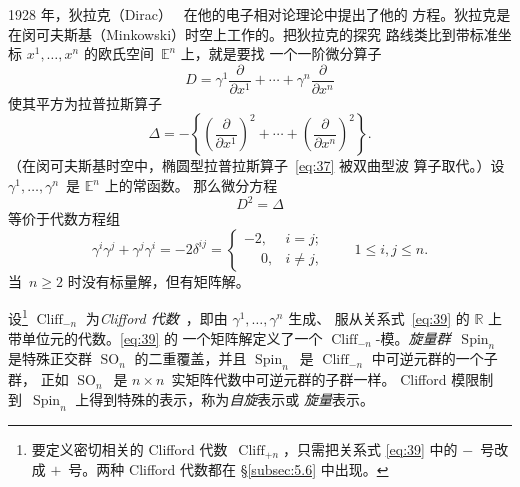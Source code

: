\documentclass[11pt]{amsart}
\theoremstyle{definition}
\theoremstyle{remark}
\theoremstyle{plain}
\numberwithin{equation}{section}
\renewcommand{\:}{\colon}
\newcommand{\EE}{\mathbb E}
\newcommand{\RR}{{\mathbb R}}
\DeclareMathOperator{\Spin}{Spin}
\newcommand{\ZZ}{{\mathbb Z}}
\DeclareMathOperator{\SO}{SO}
\DeclareMathOperator{\Cliff}{Cliff}
\newcommand{\Cnm}{\Cliff_{-n}}
\newcommand{\Cnp}{\Cliff_{+n}}
\renewcommand{\SS}{\mathbb{S}}
\begin{document}
1928 年，狄拉克（Dirac）~\cite{D} 在他的电子相对论理论中提出了他的
方程。狄拉克是在闵可夫斯基（Minkowski）时空上工作的。把狄拉克的探究
路线类比到带标准坐标 $x^1,\dots ,x^n$ 的欧氏空间~$\EE^n$ 上，就是要找
一个一阶微分算子
  \begin{equation}\label{eq:36}
     D = \gamma ^1\frac{\partial }{\partial x^1} +\cdots+\gamma
     ^n\frac{\partial }{\partial x^n} 
  \end{equation}
使其平方为拉普拉斯算子
  \begin{equation}\label{eq:37}
     \Delta =-\left\{ \left(\frac{\partial }{\partial x^1}\right)^2 + \cdots
     + \left(\frac{\partial }{\partial x^n}\right)^2 \right\} . 
  \end{equation}
（在闵可夫斯基时空中，椭圆型拉普拉斯算子~\eqref{eq:37} 被双曲型波
算子取代。）设 $\gamma ^1,\dots ,\gamma ^n$~是 $\EE^n$ 上的常函数。
那么微分方程
  \begin{equation}\label{eq:38}
     D^2=\Delta 
  \end{equation}
等价于代数方程组
  \begin{equation}\label{eq:39}
     \gamma ^i\gamma ^j + \gamma ^j\gamma ^i = -2\delta ^{ij} = \begin{cases}
     -2,&i=j;\\\phantom{-}0,&i\neq j,\end{cases}\qquad 1\le i,j\le n. 
  \end{equation}
当~$n\ge2$ 时没有标量解，但有矩阵解。


设\footnote{要定义密切相关的 Clifford 代数~$\Cnp$，只需把关系式
\eqref{eq:39} 中的 $-$~号改成 $+$~号。两种 Clifford 代数都在
§\ref{subsec:5.6} 中出现。} $\Cnm$ 为\emph{Clifford
代数}~\cite{Cl,Ca,BW,Ch,ABS}，即由 $\gamma ^1,\dots ,\gamma ^n$ 生成、
服从关系式~\eqref{eq:39} 的 $\RR$ 上带单位元的代数。\eqref{eq:39} 的
一个矩阵解定义了一个 $\Cnm$-模。\emph{旋量群}~$\Spin_n$ 是特殊正交群
$\SO_n$ 的二重覆盖，并且 $\Spin_n$~是 $\Cnm$ 中可逆元群的一个子群，
正如 $\SO_n$~是 $n\times n$~实矩阵代数中可逆元群的子群一样。
Clifford 模限制到~$\Spin_n$ 上得到特殊的表示，称为\emph{自旋}表示或
\emph{旋量}表示。
\end{document}
